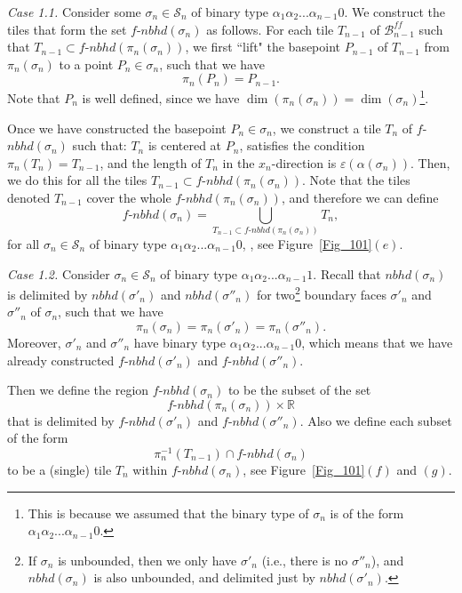 \documentclass[12pt,letterpaper]{article}
\renewcommand{\S}{\mathcal{S}}
\newcommand{\B}{\mathcal{B}}
\newcommand{\RR}{\mathbb{R}}
\newcommand{\eps}{\varepsilon}
\newcommand{\nbhd}{\mathit{nbhd}}
\renewcommand{\a}{\alpha}
\begin{document}
\bigskip

\noindent
{\em Case 1.1.} Consider some $\sigma_n \in \S_n$ of binary type $\a_1\a_2...\a_{n-1}0$. We construct the tiles that form the set $f$-$\nbhd(\sigma_n)$
as follows. 
For each tile $T_{n-1}$ of $\B_{n-1}^\mathit{ff}$ such that  $T_{n-1} \subset  f\text{-}\nbhd(\pi_n(\sigma_n))$, we first ``lift" the basepoint $P_{n-1}$ of $T_{n-1}$ from $\pi_n(\sigma_n)$ to a point $P_n \in \sigma_n$, such that we have 
$$
\pi_n(P_n) = P_{n-1}.
$$
Note that $P_n$ is well defined, since we have $\dim(\pi_n(\sigma_n)) = \dim(\sigma_n)$\footnote{This is because we assumed that the binary type of $\sigma_n$ is of the form $\a_1\a_2...\a_{n-1}0$.}. 

Once we have constructed the basepoint $P_n \in \sigma_n$, we construct a tile $T_n$ of $f$-$\nbhd(\sigma_n)$ such that: $T_n$ is centered at $P_n$, satisfies the condition $\pi_n(T_n) = T_{n-1}$, and the length of $T_n$ in the $x_n$-direction is $\eps(\alpha(\sigma_n))$.
Then, we do this for all the tiles $T_{n-1} \subset f\text{-}\nbhd(\pi_n(\sigma_n))$. Note that the tiles denoted $T_{n-1}$ cover the whole $f\text{-}\nbhd(\pi_n(\sigma_n))$, and therefore we can define 
$$
f\text{-}\nbhd(\sigma_n) = \bigcup_{T_{n-1} \subset f\text{-}\nbhd(\pi_n(\sigma_n))} T_n,
$$
for all $\sigma_n \in \S_n$ of binary type $\a_1\a_2...\a_{n-1}0$, , see Figure~\ref{Fig_101}$(e)$. 

\bigskip

{\em Case 1.2.} Consider  $\sigma_n \in \S_n$ of binary type $\a_1\a_2...\a_{n-1}1$. Recall that $\nbhd(\sigma_n)$  is delimited by $\nbhd(\sigma'_n)$ and $\nbhd(\sigma''_n)$ for two\footnote{If $\sigma_n$ is unbounded, then we only have $\sigma'_n$ (i.e., there is no $\sigma''_n$), and $\nbhd(\sigma_n)$ is also unbounded, and delimited just by $\nbhd(\sigma'_n)$. } boundary faces $\sigma'_n$ and $\sigma''_n$ of $\sigma_n$, such that we have
$$
\pi_n(\sigma_n) = \pi_n(\sigma'_n) = \pi_n(\sigma''_n). 
$$
Moreover, $\sigma'_n$ and $\sigma''_n$ have  binary type $\a_1\a_2...\a_{n-1}0$, which means that we have already constructed $f\text{-}\nbhd(\sigma'_n)$ and $f\text{-}\nbhd(\sigma''_n)$.

Then we define the region $f$-$\nbhd(\sigma_n)$ to be the subset of the set 
$$
f\text{-}\nbhd(\pi_n(\sigma_n)) \times \RR
$$
that is delimited by $f\text{-}\nbhd(\sigma'_n)$ and $f\text{-}\nbhd(\sigma''_n)$.
Also we define each subset of the form 
$$
\pi_n^{-1} (T_{n-1}) \cap f \text{-} \nbhd(\sigma_n)
$$
to be a (single) tile $T_n$ within   $f$-$\nbhd(\sigma_n)$, see Figure~\ref{Fig_101}$(f)$ and $(g)$.
\end{document}
